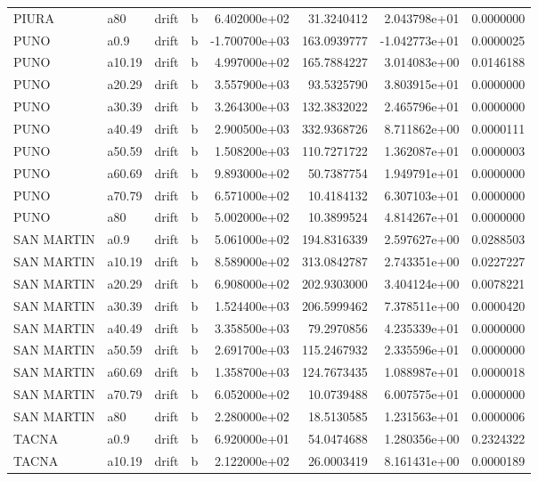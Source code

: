 \documentclass[
]{article}
\begin{document}
\begin{table}[!h]
\begin{tabular}[t]{llllrrrr}
PIURA & a80 & drift & b & 6.402000e+02 & 31.3240412 & 2.043798e+01 & 0.0000000\\
PUNO & a0.9 & drift & b & -1.700700e+03 & 163.0939777 & -1.042773e+01 & 0.0000025\\
\addlinespace
PUNO & a10.19 & drift & b & 4.997000e+02 & 165.7884227 & 3.014083e+00 & 0.0146188\\
PUNO & a20.29 & drift & b & 3.557900e+03 & 93.5325790 & 3.803915e+01 & 0.0000000\\
PUNO & a30.39 & drift & b & 3.264300e+03 & 132.3832022 & 2.465796e+01 & 0.0000000\\
PUNO & a40.49 & drift & b & 2.900500e+03 & 332.9368726 & 8.711862e+00 & 0.0000111\\
PUNO & a50.59 & drift & b & 1.508200e+03 & 110.7271722 & 1.362087e+01 & 0.0000003\\
\addlinespace
PUNO & a60.69 & drift & b & 9.893000e+02 & 50.7387754 & 1.949791e+01 & 0.0000000\\
PUNO & a70.79 & drift & b & 6.571000e+02 & 10.4184132 & 6.307103e+01 & 0.0000000\\
PUNO & a80 & drift & b & 5.002000e+02 & 10.3899524 & 4.814267e+01 & 0.0000000\\
SAN MARTIN & a0.9 & drift & b & 5.061000e+02 & 194.8316339 & 2.597627e+00 & 0.0288503\\
SAN MARTIN & a10.19 & drift & b & 8.589000e+02 & 313.0842787 & 2.743351e+00 & 0.0227227\\
\addlinespace
SAN MARTIN & a20.29 & drift & b & 6.908000e+02 & 202.9303000 & 3.404124e+00 & 0.0078221\\
SAN MARTIN & a30.39 & drift & b & 1.524400e+03 & 206.5999462 & 7.378511e+00 & 0.0000420\\
SAN MARTIN & a40.49 & drift & b & 3.358500e+03 & 79.2970856 & 4.235339e+01 & 0.0000000\\
SAN MARTIN & a50.59 & drift & b & 2.691700e+03 & 115.2467932 & 2.335596e+01 & 0.0000000\\
SAN MARTIN & a60.69 & drift & b & 1.358700e+03 & 124.7673435 & 1.088987e+01 & 0.0000018\\
\addlinespace
SAN MARTIN & a70.79 & drift & b & 6.052000e+02 & 10.0739488 & 6.007575e+01 & 0.0000000\\
SAN MARTIN & a80 & drift & b & 2.280000e+02 & 18.5130585 & 1.231563e+01 & 0.0000006\\
TACNA & a0.9 & drift & b & 6.920000e+01 & 54.0474688 & 1.280356e+00 & 0.2324322\\
TACNA & a10.19 & drift & b & 2.122000e+02 & 26.0003419 & 8.161431e+00 & 0.0000189\\

\end{tabular}
\end{table}
\end{document}
